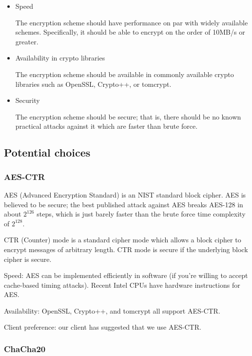 \documentclass[onecolumn, draftclsnofoot,10pt, compsoc]{IEEEtran}
\begin{document}
\begin{itemize}
  \item Speed

  The encryption scheme should have performance on par with widely available schemes. Specifically, it should be able to encrypt on the order of 10MB/s or greater.

  \item Availability in crypto libraries

  The encryption scheme should be available in commonly available crypto libraries such as OpenSSL, Crypto++, or tomcrypt.

  \item Security

  The encryption scheme should be secure; that is, there should be no known practical attacks against it which are faster than brute force.

\end{itemize}

\subsection{ Potential choices }
\subsubsection{ AES-CTR }

AES (Advanced Encryption Standard) is an NIST standard block cipher. AES is believed to be secure; the best published attack against AES breaks AES-128 in about $2^{126}$ steps, which is just barely faster than the brute force time complexity of $2^{128}$. 

CTR (Counter) mode is a standard cipher mode which allows a block cipher to encrypt messages of arbitrary length. CTR mode is secure if the underlying block cipher is secure.


Speed: AES can be implemented efficiently in software (if you're willing to accept cache-based timing attacks). Recent Intel CPUs have hardware instructions for AES.

Availability: OpenSSL, Crypto++, and tomcrypt all support AES-CTR.

Client preference: our client has suggested that we use AES-CTR.

\subsubsection{ ChaCha20 }
\end{document}
